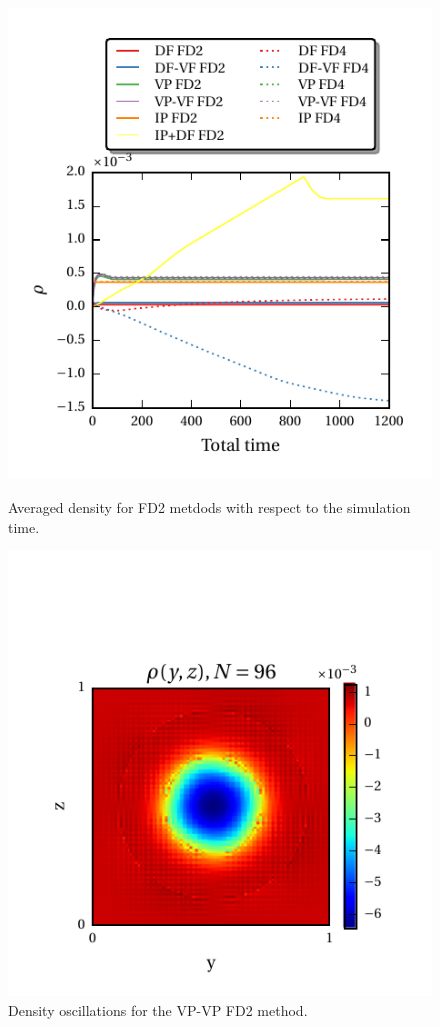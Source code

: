 \begin{figure}[!bp]
  \begin{minipage}[c]{0.5\textwidth}
      \includegraphics{gfx/immersed_boundary/tcflow/long/ts_all.pdf}
      \caption{\label{tcflow:results_long_ts_o2}
            Averaged density for FD2 metdods with respect to the simulation time.
          }
  \end{minipage}
  \begin{minipage}[c]{0.5\textwidth}
      \includegraphics{gfx/immersed_boundary/tcflow/long/example.pdf}
      \caption{\label{tcflow:rho_example}
        Density oscillations for the VP-VP FD2 method.
      }
  \end{minipage}
\end{figure}

